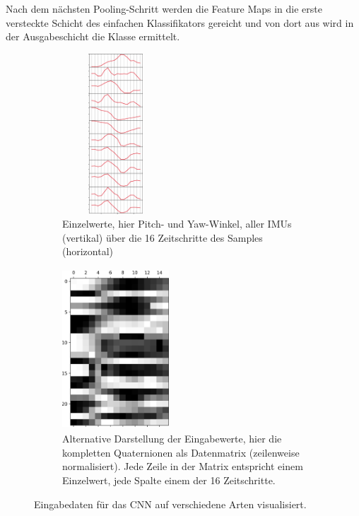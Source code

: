 Nach dem nächsten Pooling-Schritt werden die Feature Maps in die erste versteckte Schicht des einfachen Klassifikators gereicht und von dort aus wird in der Ausgabeschicht die Klasse ermittelt.

\begin{figure}
    \centering
    \begin{subfigure}[t]{0.49\textwidth}
        \centering
        \includegraphics[width=4cm,height=6cm]{../common/images/input-plot}
        \caption{Einzelwerte, hier Pitch- und Yaw-Winkel, aller IMUs (vertikal) über die 16 Zeitschritte des Samples (horizontal)}
    \end{subfigure}
    \hfill
    \begin{subfigure}[t]{0.49\textwidth}
        \centering
        \includegraphics[width=4cm,height=6cm]{../common/images/input-matrix}
        \caption{Alternative Darstellung der Eingabewerte, hier die kompletten Quaternionen als Datenmatrix (zeilenweise normalisiert). Jede Zeile in der Matrix entspricht einem Einzelwert, jede Spalte einem der 16 Zeitschritte.}
    \end{subfigure}

    \caption{Eingabedaten für das CNN auf verschiedene Arten visualisiert.}
\end{figure}

